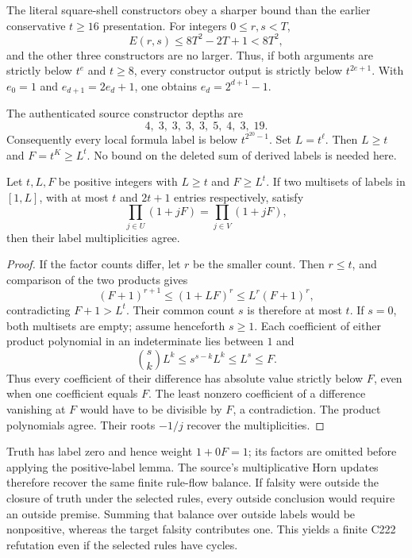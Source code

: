 The literal square-shell constructors obey a sharper bound than
the earlier conservative $t\ge16$ presentation. For integers
$0\le r,s<T$,
\[
 E(r,s)\le8T^2-2T+1<8T^2,
\]
and the other three constructors are no larger. Thus, if both
arguments are strictly below $t^e$ and $t\ge8$, every constructor
output is strictly below $t^{2e+1}$. With
$e_0=1$ and $e_{d+1}=2e_d+1$, one obtains
$e_d=2^{d+1}-1$.

The authenticated source constructor depths are
\[
 4,\;3,\;3,\;3,\;3,\;5,\;4,\;3,\;19.
\]
Consequently every local formula label is below
$t^{2^{20}-1}$. Set $L=t^\ell$. Then $L\ge t$ and
$F=t^K\ge L^t$. No bound on the deleted sum of derived labels is
needed here.

\begin{lemma}\label{lem:label}
Let $t,L,F$ be positive integers with $L\ge t$ and $F\ge L^t$.
If two multisets of labels in $[1,L]$, with at most $t$ and
$2t+1$ entries respectively, satisfy
\[
 \prod_{j\in U}(1+jF)=\prod_{j\in V}(1+jF),
\]
then their label multiplicities agree.
\end{lemma}

\begin{proof}
If the factor counts differ, let $r$ be the smaller count.
Then $r\le t$, and comparison of the two products gives
\[
 (F+1)^{r+1}\le(1+LF)^r\le L^r(F+1)^r,
\]
contradicting $F+1>L^t$. Their common count $s$ is therefore
at most $t$. If $s=0$, both multisets are empty; assume henceforth
$s\ge1$. Each coefficient of either product polynomial
in an indeterminate lies between $1$ and
\[
 \binom{s}{k}L^k\le s^{s-k}L^k\le L^s\le F.
\]
Thus every coefficient of their difference has absolute value
strictly below $F$, even when one coefficient equals $F$.
The least nonzero coefficient of a difference vanishing at $F$
would have to be divisible by $F$, a contradiction.
The product polynomials agree. Their roots $-1/j$ recover
the multiplicities.
\end{proof}

Truth has label zero and hence weight $1+0F=1$; its factors are
omitted before applying the positive-label lemma.
The source's multiplicative Horn updates therefore recover the
same finite rule-flow balance. If falsity were outside the closure
of truth under the selected rules, every outside conclusion would
require an outside premise. Summing that balance over outside labels
would be nonpositive, whereas the target falsity contributes one.
This yields a finite C222 refutation even if the selected rules have
cycles.

